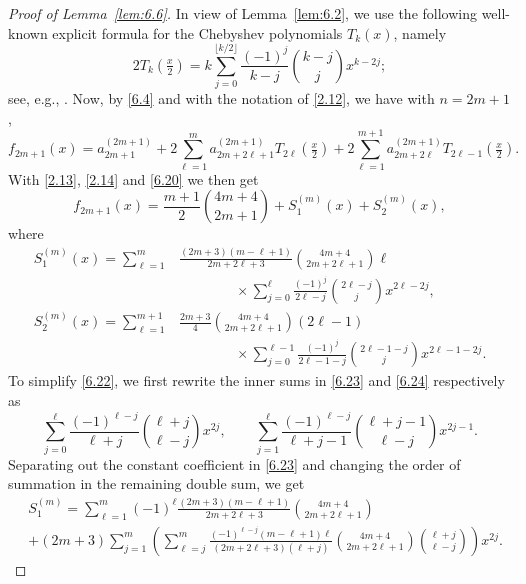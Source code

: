 \documentclass{amsart}
\theoremstyle{plain}
\numberwithin{equation}{section}
\begin{document}
\begin{proof}[Proof of Lemma~\ref{lem:6.6}]
In view of Lemma~\ref{lem:6.2}, we use the following well-known explicit 
formula for the Chebyshev polynomials $T_k(x)$, namely
\begin{equation}\label{6.20}
2T_k(\tfrac{x}{2}) = k\sum_{j=0}^{\lfloor k/2\rfloor}\frac{(-1)^j}{k-j}
\binom{k-j}{j}x^{k-2j};
\end{equation}
see, e.g., \cite[eq.~(1.96)]{Ri}. Now, by \eqref{6.4} and with the notation of
\eqref{2.12}, we have with $n=2m+1$, 
\begin{equation}\label{6.21}
f_{2m+1}(x)=a_{2m+1}^{(2m+1)}
+2\sum_{\ell=1}^m a_{2m+2\ell+1}^{(2m+1)}T_{2\ell}(\tfrac{x}{2})
+2\sum_{\ell=1}^{m+1}a_{2m+2\ell}^{(2m+1)}T_{2\ell-1}(\tfrac{x}{2}).
\end{equation}
With \eqref{2.13}, \eqref{2.14} and \eqref{6.20} we then get
\begin{equation}\label{6.22}
f_{2m+1}(x)=\frac{m+1}{2}\binom{4m+4}{2m+1}+S_1^{(m)}(x)+S_2^{(m)}(x),
\end{equation} 
where
\begin{align}
S_1^{(m)}(x)=\sum_{\ell=1}^m&\frac{(2m+3)(m-\ell+1)}{2m+2\ell+3}
\binom{4m+4}{2m+2\ell+1}\ell \label{6.23}\\
&\qquad\qquad\times\sum_{j=0}^{\ell}\frac{(-1)^j}{2\ell-j}
\binom{2\ell-j}{j}x^{2\ell-2j},\nonumber\\
S_2^{(m)}(x)=\sum_{\ell=1}^{m+1}&\frac{2m+3}{4}
\binom{4m+4}{2m+2\ell+1}(2\ell-1) \label{6.24}\\
&\qquad\qquad\times\sum_{j=0}^{\ell-1}\frac{(-1)^j}{2\ell-1-j}
\binom{2\ell-1-j}{j}x^{2\ell-1-2j}.\nonumber
\end{align}
To simplify \eqref{6.22}, we first rewrite the inner sums in \eqref{6.23} and
\eqref{6.24} respectively as
\begin{equation}\label{6.25}
\sum_{j=0}^{\ell}\frac{(-1)^{\ell-j}}{\ell+j}\binom{\ell+j}{\ell-j}x^{2j},\qquad
\sum_{j=1}^{\ell}\frac{(-1)^{\ell-j}}{\ell+j-1}\binom{\ell+j-1}{\ell-j}x^{2j-1}.
\end{equation}
Separating out the constant coefficient in \eqref{6.23} and changing the order
of summation in the remaining double sum, we get
\begin{align}
&S_1^{(m)}=\sum_{\ell=1}^m(-1)^\ell\frac{(2m+3)(m-\ell+1)}{2m+2\ell+3}
\binom{4m+4}{2m+2\ell+1}\label{6.26}\\
&+(2m+3)\sum_{j=1}^m\left(
\sum_{\ell=j}^m\frac{(-1)^{\ell-j}(m-\ell+1)\ell}{(2m+2\ell+3)(\ell+j)}
\binom{4m+4}{2m+2\ell+1}\binom{\ell+j}{\ell-j}\right)x^{2j}.\nonumber

\end{align}
\end{proof}
\end{document}
